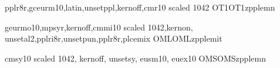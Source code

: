 

%
%




%


\installfonts

    {}
    {}
     {}
     {}
   

%
      {pplr8r,gceurm10,latin,unsetppl,kernoff,cmr10 scaled 1042}
      {OT1}{OT1}{zpple}{m}{n}{}

%
      {geurmo10,mpsyr,kernoff,cmmi10 scaled 1042,kernon,
      unsetal2,pplri8r,unsetpun,pplr8r,plcemix}
      {OML}{OML}{zpple}{m}{it}{}

%
      {cmsy10 scaled 1042, kernoff, unsetsy, eusm10, euex10}
      {OMS}{OMS}{zpple}{m}{n}{}

